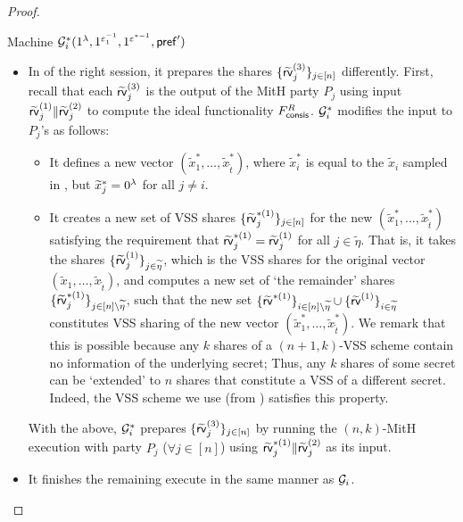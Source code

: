 \begin{proof}
\begin{AlgorithmBox}[label={machine:Gi*}]{Machine \textnormal{$\mathcal{G}^*_i(1^\lambda, 1^{\varepsilon_1^{-1}},  1^{\varepsilon^{*-1}}, \mathsf{pref}')$}}
\begin{itemize}
\item
In  of the right session, it prepares the shares $\{\widetilde{\mathsf{rv}}^{(3)}_j\}_{j\in [n]}$ differently. First, recall that each $\widetilde{\mathsf{rv}}^{(3)}_j$ is the output of the MitH party $P_j$ using input $\widetilde{\mathsf{rv}}^{(1)}_j\|\widetilde{\mathsf{rv}}^{(2)}_j$ to compute the ideal functionality $F^R_{\mathsf{consis}}$. $\mathcal{G}^*_i$ modifies the input to $P_j$'s as follows: 
\begin{itemize}
\item
It defines a new vector $(\tilde{x}^*_1, \ldots, \tilde{x}^*_{\tilde{t}})$, where $\tilde{x}^*_i$ is equal to the $\tilde{x}_i$ sampled in , but $\widetilde{x}^*_j = 0^\lambda$ for all $j \ne i$.
\item
It creates a new set of VSS shares $\{\widetilde{\mathsf{rv}}^{*(1)}_j\}_{j \in [n]}$ for the new $(\tilde{x}^*_1, \ldots, \tilde{x}^*_{\tilde{t}})$ satisfying the requirement that $\widetilde{\mathsf{rv}}^{*(1)}_j = \widetilde{\mathsf{rv}}^{(1)}_j$ for all $j \in \tilde{\eta}$. That is, it takes the shares $\{\widetilde{\mathsf{rv}}^{(1)}_j\}_{j \in \widetilde{\eta}}$, which is the VSS shares for the original vector $(\tilde{x}_1, \ldots, \tilde{x}_{\tilde{t}})$, and computes a new set of `the remainder' shares $\{\widetilde{\mathsf{rv}}^{*(1)}_j\}_{j \in [n]\setminus \widetilde{\eta}}$, such that the new set $\{\widetilde{\mathsf{rv}}^{*(1)}\}_{i \in [n]\setminus \widetilde{\eta}} \cup \{\widetilde{\mathsf{rv}}^{(1)}\}_{i \in \widetilde{\eta}}$ constitutes VSS sharing of the new vector $(\tilde{x}^*_1, \ldots, \tilde{x}^*_{\tilde{t}})$. We remark that this is possible because any $k$ shares of a $(n+1, k)$-VSS scheme contain no information of the underlying secret; Thus, any $k$ shares of some secret can be `extended' to $n$ shares that constitute a VSS of a different secret. Indeed, the VSS scheme we use (from \cite{EC:CDDHR99}) satisfies this property.
\end{itemize}
With the above, $\mathcal{G}^*_i$ prepares $\{\widetilde{\mathsf{rv}}^{(3)}_j\}_{j\in [n]}$ by running the $(n,k)$-MitH execution with party $P_j$ ($\forall j \in [n]$) using $\widetilde{\mathsf{rv}}^{*(1)}_j\|\widetilde{\mathsf{rv}}^{(2)}_j$ as its input.
\item
It finishes the remaining execute in the same manner as $\mathcal{G}_i$.
\end{itemize}
\end{AlgorithmBox}


\end{proof}
